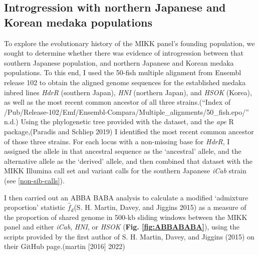 \documentclass[
]{book}
\begin{document}
\hypertarget{introgression-sec}{%
\subsection{Introgression with northern Japanese and Korean medaka populations}\label{introgression-sec}}

To explore the evolutionary history of the MIKK panel's founding population, we sought to determine whether there was evidence of introgression between that southern Japanese population, and northern Japanese and Korean medaka populations. To this end, I used the 50-fish multiple alignment from Ensembl release 102 to obtain the aligned genome sequences for the established medaka inbred lines \emph{HdrR} (southern Japan), \emph{HNI} (northern Japan), and \emph{HSOK} (Korea), as well as the most recent common ancestor of all three strains.({``Index of /Pub/Release-102/Emf/Ensembl-Compara/Multiple\_alignments/50\_fish.epo/''} n.d.) Using the phylogenetic tree provided with the dataset, and the \emph{ape} R package,(Paradis and Schliep 2019) I identified the most recent common ancestor of those three strains. For each locus with a non-missing base for \emph{HdrR}, I assigned the allele in that ancestral sequence as the `ancestral' allele, and the alternative allele as the `derived' allele, and then combined that dataset with the MIKK Illumina call set and variant calls for the southern Japanese \emph{iCab} strain (see \ref{non-sib-calls}).

I then carried out an ABBA BABA analysis to calculate a modified `admixture proportion' statistic \(\hat{f}_d\)(S. H. Martin, Davey, and Jiggins 2015) as a measure of the proportion of shared genome in 500-kb sliding windows between the MIKK panel and either \emph{iCab}, \emph{HNI}, or \emph{HSOK} (\textbf{Fig. \ref{fig:ABBABABA}}), using the scripts provided by the first author of S. H. Martin, Davey, and Jiggins (2015) on their GitHub page.(martin {[}2016{]} 2022)
\end{document}
